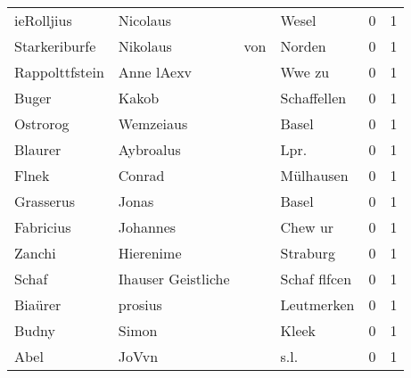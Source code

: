 \begin{tabular}{llllrr}
               ieRolljius &                           Nicolaus &             &                                       Wesel &          0 &         1 \\
            Starkeriburfe &                           Nikolaus &         von &                                      Norden &          0 &         1 \\
           Rappolttfstein &                         Anne lAexv &             &                                      Wwe zu &          0 &         1 \\
                    Buger &                              Kakob &             &                                 Schaffellen &          0 &         1 \\
                 Ostrorog &                          Wemzeiaus &             &                                       Basel &          0 &         1 \\
                  Blaurer &                          Aybroalus &             &                                       Lpr.  &          0 &         1 \\
                    Flnek &                             Conrad &             &                                   Mülhausen &          0 &         1 \\
                Grasserus &                              Jonas &             &                                       Basel &          0 &         1 \\
                Fabricius &                           Johannes &             &                                     Chew ur &          0 &         1 \\
                   Zanchi &                          Hierenime &             &                                    Straburg &          0 &         1 \\
                    Schaf &                 Ihauser Geistliche &             &                                Schaf flfcen &          0 &         1 \\
                  Biaürer &                            prosius &             &                                  Leutmerken &          0 &         1 \\
                    Budny &                              Simon &             &                                       Kleek &          0 &         1 \\
                     Abel &                              JoVvn &             &                                        s.l. &          0 &         1 \\

\end{tabular}
